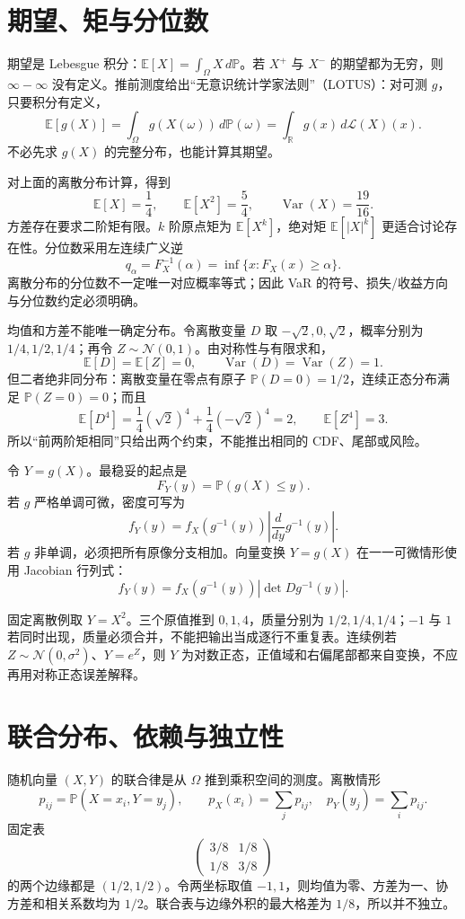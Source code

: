 \section{期望、矩与分位数}

期望是 Lebesgue 积分：$\mathbb{E}[X]=\int_\Omega X\,d\mathbb P$。若 $X^+$ 与 $X^-$ 的期望都为无穷，则 $\infty-\infty$ 没有定义。推前测度给出“无意识统计学家法则”（LOTUS）：对可测 $g$，只要积分有定义，
\[
  \mathbb E[g(X)]
  =\int_\Omega g(X(\omega))\,d\mathbb P(\omega)
  =\int_{\mathbb R}g(x)\,d\mathcal L(X)(x).
\]
不必先求 $g(X)$ 的完整分布，也能计算其期望。

对上面的离散分布计算，得到
\[
  \mathbb E[X]=\frac14,\qquad
  \mathbb E[X^2]=\frac54,
  \qquad \operatorname{Var}(X)=\frac{19}{16}.
\]
方差存在要求二阶矩有限。$k$ 阶原点矩为 $\mathbb E[X^k]$，绝对矩 $\mathbb E[|X|^k]$ 更适合讨论存在性。分位数采用左连续广义逆
\[
  q_\alpha=F_X^{-1}(\alpha)=\inf\{x:F_X(x)\ge\alpha\}.
\]
离散分布的分位数不一定唯一对应概率等式；因此 VaR 的符号、损失/收益方向与分位数约定必须明确。

均值和方差不能唯一确定分布。令离散变量 $D$ 取
$-\sqrt2,0,\sqrt2$，概率分别为 $1/4,1/2,1/4$；再令
$Z\sim\mathcal N(0,1)$。由对称性与有限求和，
\[
  \mathbb E[D]=\mathbb E[Z]=0,
  \qquad \operatorname{Var}(D)=\operatorname{Var}(Z)=1.
\]
但二者绝非同分布：离散变量在零点有原子
$\mathbb P(D=0)=1/2$，连续正态分布满足 $\mathbb P(Z=0)=0$；而且
\[
  \mathbb E[D^4]
  =\frac14(\sqrt2)^4+\frac14(-\sqrt2)^4=2,
  \qquad \mathbb E[Z^4]=3.
\]
所以“前两阶矩相同”只给出两个约束，不能推出相同的 CDF、尾部或风险。


令 $Y=g(X)$。最稳妥的起点是
\[
 F_Y(y)=\mathbb P(g(X)\le y).
\]
若 $g$ 严格单调可微，密度可写为
\[
 f_Y(y)=f_X(g^{-1}(y))
 \left|\frac{d}{dy}g^{-1}(y)\right|.
\]
若 $g$ 非单调，必须把所有原像分支相加。向量变换 $Y=g(X)$ 在一一可微情形使用 Jacobian 行列式：
\[
 f_Y(y)=f_X(g^{-1}(y))\left|\det Dg^{-1}(y)\right|.
\]

固定离散例取 $Y=X^2$。三个原值推到 $0,1,4$，质量分别为 $1/2,1/4,1/4$；$-1$ 与 $1$ 若同时出现，质量必须合并，不能把输出当成逐行不重复表。连续例若 $Z\sim\mathcal N(0,\sigma^2)$、$Y=e^Z$，则 $Y$ 为对数正态，正值域和右偏尾部都来自变换，不应再用对称正态误差解释。

\section{联合分布、依赖与独立性}

随机向量 $(X,Y)$ 的联合律是从 $\Omega$ 推到乘积空间的测度。离散情形
\[
 p_{ij}=\mathbb P(X=x_i,Y=y_j),\qquad
 p_X(x_i)=\sum_jp_{ij},\quad p_Y(y_j)=\sum_ip_{ij}.
\]
固定表
\[
  \begin{pmatrix}3/8&1/8\\1/8&3/8\end{pmatrix}
\]
的两个边缘都是 $(1/2,1/2)$。令两坐标取值 $-1,1$，则均值为零、方差为一、协方差和相关系数均为 $1/2$。联合表与边缘外积的最大格差为 $1/8$，所以并不独立。

